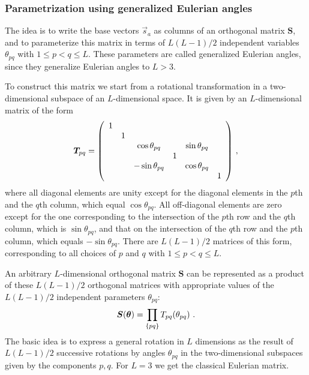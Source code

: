 \documentclass[preprint,amsmath,amssymb,superscriptaddress,showpacs,pre]{revtex4-1}
\let\originalleft\left
\let\originalright\right
\renewcommand{\left}{\mathopen{}\mathclose\bgroup\originalleft}
\renewcommand{\right}{\aftergroup\egroup\originalright}
\begin{document}
\subsubsection{Parametrization using generalized Eulerian angles}
The idea is to write the base vectors $\vec{s}_a$ as columns of an orthogonal matrix $\bm S$, and to parameterize this matrix in terms of $L(L-1)/2$ independent variables  $\theta_ {pq}$ with $1 \leq p <q \leq L $. These parameters are called generalized Eulerian angles, since they generalize Eulerian angles to $L>3$. 

To construct this matrix we start from a rotational transformation in a two-dimensional subspace of an $L$-dimensional space. It is given by an $L$-dimensional matrix of the form
\begin{equation} 
\bm T_{pq} =  \left(
\begin{array}{cccccc}
1 &   &  &  &  &\\
 & 1& & & & \\
& & \cos\theta_{pq} & & \sin\theta_{pq}\\
& &  & 1 & &\\
& &  -\sin\theta_{pq}& & \cos\theta_{pq} &\\
& &  & &  & 1\\
\end{array}
\right) \ ,
\end{equation}
where all diagonal elements are unity except for the diagonal elements in the $p$th and the $q$th column, which equal $\cos\theta_{pq}$. All off-diagonal elements are zero except for the one corresponding to the intersection of the $p$th row and the $q$th column, which is $\sin\theta_{pq}$, and that on the intersection of the $q$th row and the $p$th column, which equals $-\sin\theta_{pq}$. There are $L(L - 1)/2$  matrices of this form, corresponding to all choices of $p$ and $q$ with $1\leq p <q\leq L$. 

An arbitrary $L$-dimensional orthogonal matrix $\bm S$ can be represented as a product of these $L(L-1)/2$ orthogonal matrices with appropriate values of the $L(L-1)/2$ independent parameters $\theta_{pq}$:
\begin{equation}
\label{eq:eulerprod}
\bm S (\bm \theta)=\prod_{\left\lbrace pq\right\rbrace }T_{pq}(\theta_{pq}) \ .
\end{equation}
The basic idea is to express a general rotation in $L$ dimensions as the result of $L(L-1)/2$ successive rotations by angles $\theta_ {pq}$ in the two-dimensional subspaces given by the components $p, q$. For $L=3$ we get the classical Eulerian matrix. 
\end{document}
